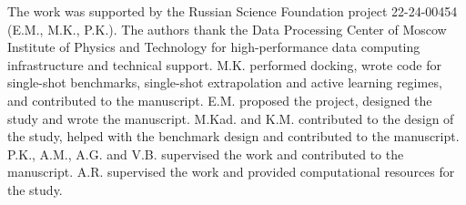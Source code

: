 \begin{acknowledgement}

The work was supported by the Russian Science Foundation project 22-24-00454 (E.M., M.K., P.K.). The authors thank the Data Processing Center of Moscow Institute of Physics and Technology for high-performance data computing infrastructure and technical support.
M.K. performed docking, wrote code for single-shot benchmarks, single-shot extrapolation and active learning regimes, and contributed to the manuscript.
E.M. proposed the project, designed the study and wrote the manuscript.
M.Kad. and K.M. contributed to the design of the study, helped with the benchmark design and contributed to the manuscript.
P.K., A.M., A.G. and V.B. supervised the work and contributed to the manuscript.
A.R. supervised the work and provided computational resources for the study.

\end{acknowledgement}
